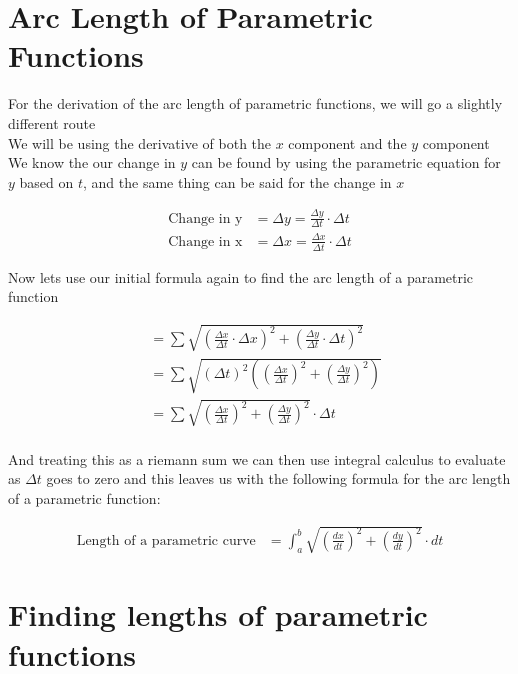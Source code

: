 \documentclass[12pt]{extarticle}
\begin{document}
\vspace{10cm}

\section{Arc Length of Parametric Functions}

For the derivation of the arc length of parametric functions, we will go a slightly different route \\
We will be using the derivative of both the $x$ component and the $y$ component \\ We know the our change in $y$ can be found by using the parametric equation for $y$ based on $t$, and the same thing can be said for the change in $x$

\begin{align} 
    \text{Change in y} &= \Delta y = \frac{\Delta y}{\Delta t} \cdot \Delta t \\
    \text{Change in x} &= \Delta x = \frac{\Delta x}{\Delta t} \cdot \Delta t  
\end{align}

Now lets use our initial formula again to find the arc length of a parametric function


\begin{align} 
    &= \sum \sqrt{(\frac{\Delta x}{\Delta t} \cdot \Delta x)^2 + (\frac{\Delta y}{\Delta t} \cdot \Delta t) ^ 2} \\ 
    &= \sum \sqrt{(\Delta t)^2((\frac{\Delta x}{\Delta t})^2 + (\frac{\Delta y}{\Delta t}) ^ 2)} \\ 
    &= \sum \sqrt{(\frac{\Delta x}{\Delta t})^2 + (\frac{\Delta y}{\Delta t}) ^ 2} \cdot \Delta t \\ 
\end{align}

And treating this as a riemann sum we can then use integral calculus to evaluate as $\Delta t$ goes to zero and this leaves us with the following formula for the arc length of a parametric function:

\begin{align} 
    \text{Length of a parametric curve} &= \int_{a}^{b} \sqrt{(\frac{dx}{dt})^2 + (\frac{dy}{dt}) ^ 2} \cdot dt  
\end{align}

\section{Finding lengths of parametric functions}
\end{document}
